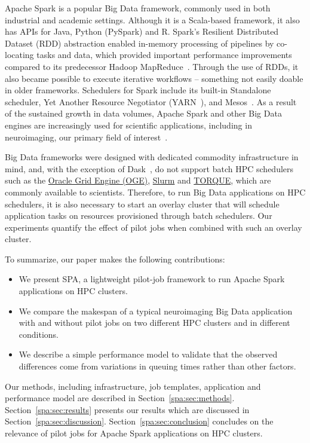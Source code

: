     Apache Spark is a popular Big Data framework, commonly used in both
    industrial and academic settings. Although it is a Scala-based framework, it
    also has APIs for Java, Python (PySpark) and R. Spark's Resilient
    Distributed Dataset (RDD) abstraction enabled in-memory processing of
    pipelines by co-locating tasks and data, which provided important
    performance improvements compared to its predecessor Hadoop
    MapReduce~\cite{dean2008mapreduce}. Through the use of RDDs, it also became
    possible to execute iterative workflows -- something not easily doable in
    older frameworks. Schedulers for Spark include its built-in Standalone
    scheduler, Yet Another Resource Negotiator (YARN~\cite{apache13yet}), and
    Mesos~\cite{hindman2011mesos}. As a result of the sustained growth in data
    volumes, Apache Spark and other Big Data engines are increasingly used for
    scientific applications, including in neuroimaging, our primary field of
    interest~\cite{boubela2016big,mehta2017comparative,freeman2014mapping}.
    
    
    Big Data frameworks were designed with dedicated commodity infrastructure in
    mind, and, with the exception of Dask~\cite{rocklin2015dask}, do not support
    batch HPC schedulers such as the
    \href{http://www.univa.com/products/}{Oracle Grid Engine (OGE)},
    \href{https://slurm.schedmd.com/}{Slurm} and
    \href{https://www.adaptivecomputing.com/products/torque/}{TORQUE}, which are
    commonly available to scientists. Therefore, to run Big Data applications on
    HPC schedulers, it is also necessary to start an overlay cluster that will
    schedule application tasks on resources provisioned through batch
    schedulers. Our experiments quantify the effect of pilot jobs when combined
    with such an overlay cluster.
    
    To summarize, our paper makes the following contributions:
    \begin{itemize}
    \item We present SPA, a lightweight pilot-job framework to run Apache Spark
    applications on HPC clusters.
    \item We compare the makespan of a typical neuroimaging Big Data application
    with and without pilot jobs on two different HPC clusters and in different
    conditions.
    \item We describe a simple performance model to validate that the observed
    differences come from variations in queuing times rather than other factors.
    \end{itemize}
    Our methods, including infrastructure, job templates, application and
    performance model are described in Section~\ref{spa:sec:methods}.
    Section~\ref{spa:sec:results} presents our results which are discussed in
    Section~\ref{spa:sec:discussion}. Section~\ref{spa:sec:conclusion} concludes on
    the relevance of pilot jobs for Apache Spark applications on HPC clusters.
    
